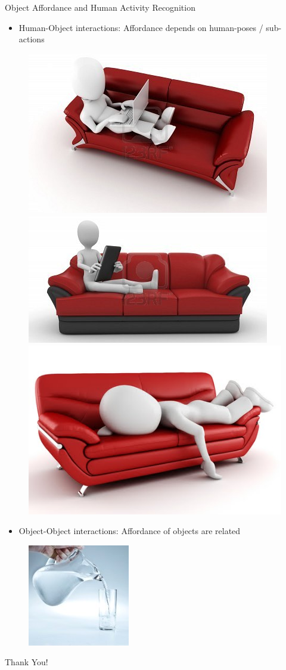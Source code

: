 \documentclass{beamer}
\begin{document}
\begin{frame}{Object Affordance and Human Activity Recognition}
\begin{itemize}
\item Human-Object interactions: Affordance depends on human-poses / sub-actions
\end{itemize}
\begin{figure}[t!]
\includegraphics[width=.25\linewidth]{couch_sit.jpg}
\includegraphics[width=.25\linewidth]{couch_read.jpg}
\includegraphics[width=.25\linewidth]{couch_sleep.jpg}
\end{figure}
\begin{itemize}
\item Object-Object interactions: Affordance of objects are related
\end{itemize}
\begin{figure}[h]
\includegraphics[width=.25\linewidth]{pitcher-pouring.jpg}
\end{figure}
\end{frame}


\begin{frame}
\begin{center}
{\Huge 
Thank You!
}
\end{center}
\end{frame}
\end{document}
